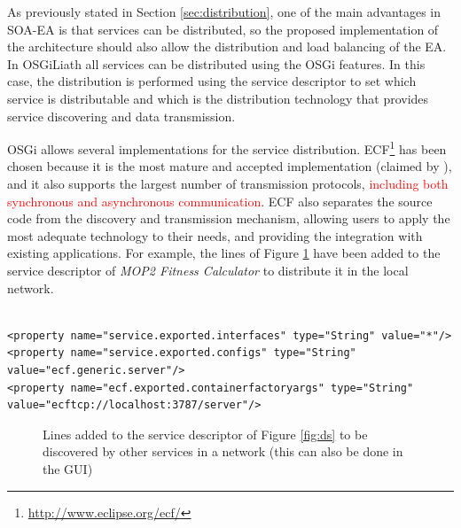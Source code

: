 As previously stated in Section \ref{sec:distribution}, one of the main advantages in SOA-EA is that services can be distributed, so the proposed implementation of the architecture  should also allow  the distribution and load balancing of the EA. In OSGiLiath all services can be distributed using the OSGi features. In this case, the distribution is performed using the service descriptor to set which service is distributable and which is the distribution technology that provides service discovering and data transmission.

OSGi allows several implementations for the service distribution. ECF\footnote{\url{http://www.eclipse.org/ecf/}} has been chosen because it is the most mature and accepted implementation (claimed by  \cite{petzold2011dynamic}), and it also supports the largest number of transmission protocols, \textcolor{red}{including both synchronous and asynchronous communication}. ECF also separates the source code from the discovery and transmission mechanism, allowing users to apply the most adequate technology to their needs, and providing the integration with existing applications. For example, the lines of Figure \ref{fig:remote} have been added to the service descriptor of {\em MOP2 Fitness Calculator} to distribute it in the local network.

\newsavebox{\mintedboxServer}
\begin{lrbox}{\mintedboxServer}
\begin{minipage}{10cm}
\begin{verbatim}

<property name="service.exported.interfaces" type="String" value="*"/>
<property name="service.exported.configs" type="String" 
value="ecf.generic.server"/>
<property name="ecf.exported.containerfactoryargs" type="String" 
value="ecftcp://localhost:3787/server"/>
\end{verbatim}
\end{minipage}
\end{lrbox}

\begin{figure}
\usebox{\mintedboxServer}
\caption{Lines added to the service descriptor of Figure \ref{fig:ds} to be discovered by other services in a network  (this can also be done in the GUI)} 
\label{fig:remote} 
\end{figure}

